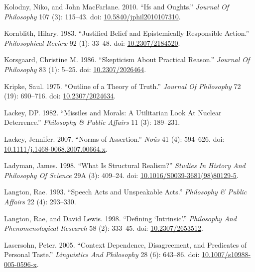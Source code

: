\documentclass[
  10pt,
  letterpaper,
  DIV=11,
  numbers=noendperiod,
  twoside]{scrartcl}
\newlength{\cslhangindent}
\newenvironment{CSLReferences}[2] %
 {\begin{list}{}{%
  \setlength{\itemindent}{0pt}
  \setlength{\leftmargin}{0pt}
  \setlength{\parsep}{0pt}
  \ifodd #1
   \setlength{\leftmargin}{\cslhangindent}
   \setlength{\itemindent}{-1\cslhangindent}
  \fi
  \setlength{\itemsep}{#2\baselineskip}}}
 {\end{list}}
\begin{document}
\begin{CSLReferences}{1}{0}
Kolodny, Niko, and John MacFarlane. 2010. {``Ifs and Oughts.''}
\emph{Journal Of Philosophy} 107 (3): 115--43. doi:
\href{https://doi.org/10.5840/jphil2010107310}{10.5840/jphil2010107310}.

Kornblith, Hilary. 1983. {``Justified Belief and Epistemically
Responsible Action.''} \emph{Philosophical Review} 92 (1): 33--48. doi:
\href{https://doi.org/10.2307/2184520}{10.2307/2184520}.

Korsgaard, Christine M. 1986. {``Skepticism About Practical Reason.''}
\emph{Journal Of Philosophy} 83 (1): 5--25. doi:
\href{https://doi.org/10.2307/2026464}{10.2307/2026464}.

Kripke, Saul. 1975. {``Outline of a Theory of Truth.''} \emph{Journal Of
Philosophy} 72 (19): 690--716. doi:
\href{https://doi.org/10.2307/2024634}{10.2307/2024634}.

Lackey, DP. 1982. {``Missiles and Morals: A Utilitarian Look At Nuclear
Deterrence.''} \emph{Philosophy \& Public Affairs} 11 (3): 189--231.

Lackey, Jennifer. 2007. {``Norms of Assertion.''} \emph{Noûs} 41 (4):
594--626. doi:
\href{https://doi.org/10.1111/j.1468-0068.2007.00664.x}{10.1111/j.1468-0068.2007.00664.x}.

Ladyman, James. 1998. {``What Is Structural Realism?''} \emph{Studies In
History And Philosophy Of Science} 29A (3): 409--24. doi:
\href{https://doi.org/10.1016/S0039-3681(98)80129-5}{10.1016/S0039-3681(98)80129-5}.

Langton, Rae. 1993. {``Speech Acts and Unspeakable Acts.''}
\emph{Philosophy \& Public Affairs} 22 (4): 293--330.

Langton, Rae, and David Lewis. 1998. {``Defining {`Intrinsic'}.''}
\emph{Philosophy And Phenomenological Research} 58 (2): 333--45. doi:
\href{https://doi.org/10.2307/2653512}{10.2307/2653512}.

Lasersohn, Peter. 2005. {``Context Dependence, Disagreement, and
Predicates of Personal Taste.''} \emph{Linguistics And Philosophy} 28
(6): 643--86. doi:
\href{https://doi.org/10.1007/s10988-005-0596-x}{10.1007/s10988-005-0596-x}.


\end{CSLReferences}
\end{document}

